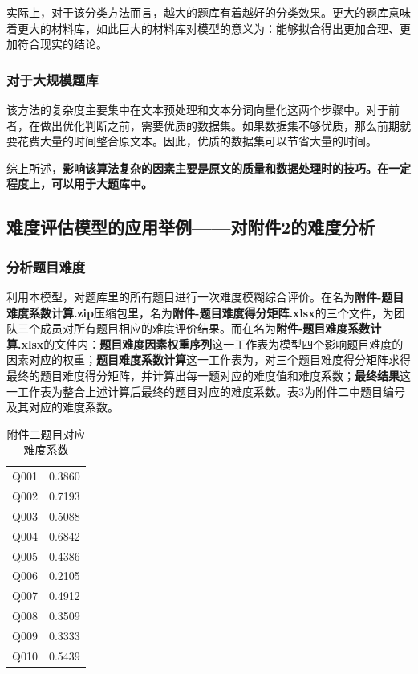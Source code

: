 实际上，对于该分类方法而言，越大的题库有着越好的分类效果。更大的题库意味着更大的材料库，如此巨大的材料库对模型的意义为：能够拟合得出更加合理、更加符合现实的结论。


\subsubsection{对于大规模题库}

该方法的复杂度主要集中在文本预处理和文本分词向量化这两个步骤中。对于前者，在做出优化判断之前，需要优质的数据集。如果数据集不够优质，那么前期就要花费大量的时间整合原文本。因此，优质的数据集可以节省大量的时间。

综上所述，\textbf{影响该算法复杂的因素主要是原文的质量和数据处理时的技巧。在一定程度上，可以用于大题库中。}

\subsection{难度评估模型的应用举例——对附件2的难度分析}

\subsubsection{分析题目难度}

利用本模型，对题库里的所有题目进行一次难度模糊综合评价。在名为\textbf{附件-题目难度系数计算.zip}压缩包里，名为\textbf{附件-题目难度得分矩阵.xlsx}的三个文件，为团队三个成员对所有题目相应的难度评价结果。而在名为\textbf{附件-题目难度系数计算.xlsx}的文件内：\textbf{题目难度因素权重序列}这一工作表为模型四个影响题目难度的因素对应的权重；\textbf{题目难度系数计算}这一工作表为，对三个题目难度得分矩阵求得最终的题目难度得分矩阵，并计算出每一题对应的难度值和难度系数；\textbf{最终结果}这一工作表为整合上述计算后最终的题目对应的难度系数。表3为附件二中题目编号及其对应的难度系数。

\begin{table}[htbp]
    \centering
    \label{tableDiff}
    \caption{附件二题目对应难度系数}
    \begin{tabular}{@{}cc@{}}
    \toprule
    \quad\quad\quad\quad{}\quad\quad\quad\quad\quad & \quad\quad\quad\quad{}\quad\quad\quad\quad\quad\\ \midrule
    Q001 & 0.3860 \\
    Q002 & 0.7193 \\
    Q003 & 0.5088 \\
    Q004 & 0.6842 \\
    Q005 & 0.4386 \\
    Q006 & 0.2105 \\
    Q007 & 0.4912 \\
    Q008 & 0.3509 \\
    Q009 & 0.3333 \\
    Q010 & 0.5439 \\ \bottomrule
    \end{tabular}
\end{table}

